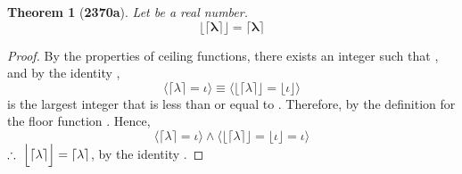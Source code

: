 \documentclass[preview]{standalone}
\newtheorem{theorem}{Theorem}
\begin{document}
\begin{theorem}[\textbf{2370a}]
    Let \bm{$\lambda$} be a real number. 
    \begin{equation*}
        \bm{
            \Big \lfloor \lceil \lambda \rceil \Big \rfloor 
                = 
            \lceil \lambda \rceil
        }
    \end{equation*}
\end{theorem}

\begin{proof}
    By the properties of ceiling functions,
    there exists an integer \bm{$\iota$} such that
    \bm{$\lceil \lambda \rceil = \iota$}, 
    and by the identity \bm{$\iota$},
    \begin{equation*}
        \bigg \langle \lceil \lambda \rceil = \iota \bigg \rangle
            \equiv
        \bigg \langle 
            \Big \lfloor \lceil \lambda \rceil \Big \rfloor
                =
            \big \lfloor \iota \big \rfloor
        \bigg \rangle
    \end{equation*}
    \bm{$\iota$} is the largest integer that is less than or equal to \bm{$\iota$}.
    Therefore, by the definition for the floor function
    \bm{$\lfloor \iota \rfloor = \iota$}.
    Hence,
    \begin{equation*}
        \bigg \langle \lceil \lambda \rceil = \iota \bigg \rangle
            \land
        \bigg \langle 
            \Big \lfloor \lceil \lambda \rceil \Big \rfloor
                =
            \big \lfloor \iota \big \rfloor
                =
            \iota
        \bigg \rangle
    \end{equation*}
    $\therefore \text{\space} \relax{
        \Big \lfloor \lceil \lambda \rceil \Big \rfloor 
            = 
        \lceil \lambda \rceil
    }$, by the identity \bm{$\iota$}.
\end{proof}
\end{document}
